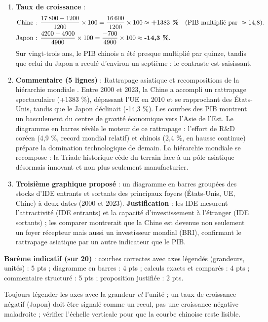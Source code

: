\documentclass[11pt]{article}
\begin{document}
\begin{corrige}
\begin{enumerate}
\begin{popfigure}
\end{popfigure}
\item \textbf{Taux de croissance} :
\begin{align*}
\text{Chine : } & \frac{\num{17800} - \num{1200}}{\num{1200}} \times 100 = \frac{\num{16600}}{\num{1200}} \times 100 \approx \textbf{+\num{1383}\ \%} \quad (\text{PIB multipli\'e par } \approx 14{,}8). \\
\text{Japon : } & \frac{\num{4200} - \num{4900}}{\num{4900}} \times 100 = \frac{\num{-700}}{\num{4900}} \times 100 \approx \textbf{-14{,}3\ \%}.
\end{align*}
Sur vingt-trois ans, le PIB chinois a été presque multiplié par quinze, tandis que celui du Japon a reculé d'environ un septième : le contraste est saisissant.
\item \textbf{Commentaire (5 lignes)} : \og Rattrapage asiatique et recompositions de la hiérarchie mondiale \fg{}. Entre 2000 et 2023, la Chine a accompli un rattrapage spectaculaire (+\num{1383} \%), dépassant l'UE en 2010 et se rapprochant des États-Unis, tandis que le Japon déclinait (-14,3 \%). Les courbes des PIB montrent un basculement du centre de gravité économique vers l'Asie de l'Est. Le diagramme en barres révèle le moteur de ce rattrapage : l'effort de R\&D coréen (4,9 \%, record mondial relatif) et chinois (2,4 \%, en hausse continue) prépare la domination technologique de demain. La hiérarchie mondiale se recompose : la Triade historique cède du terrain face à un pôle asiatique désormais innovant et non plus seulement manufacturier.
\item \textbf{Troisième graphique proposé} : un diagramme en barres groupées des stocks d'IDE entrants et sortants des principaux foyers (États-Unis, UE, Chine) à deux dates (2000 et 2023). \textbf{Justification} : les IDE mesurent l'attractivité (IDE entrants) et la capacité d'investissement à l'étranger (IDE sortants) ; les comparer montrerait que la Chine est devenue non seulement un foyer récepteur mais aussi un investisseur mondial (BRI), confirmant le rattrapage asiatique par un autre indicateur que le PIB.
\end{enumerate}
\textbf{Barème indicatif (sur 20)} : courbes correctes avec axes légendés (grandeurs, unités) : 5 pts ; diagramme en barres : 4 pts ; calculs exacts et comparés : 4 pts ; commentaire structuré : 5 pts ; proposition justifiée : 2 pts.
\begin{attention}
Toujours légender les axes avec la grandeur \emph{et} l'unité ; un taux de croissance négatif (Japon) doit être signalé comme un recul, pas une \og croissance négative \fg{} maladroite ; vérifier l'échelle verticale pour que la courbe chinoise reste lisible.
\end{attention}
\end{corrige}
\end{document}
